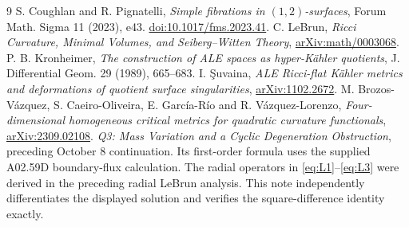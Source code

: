 \documentclass[11pt]{article}
\begin{document}
\begin{thebibliography}{9}
 S. Coughlan and R. Pignatelli,
\emph{Simple fibrations in $(1,2)$-surfaces},
Forum Math. Sigma 11 (2023), e43.
\href{https://doi.org/10.1017/fms.2023.41}{doi:10.1017/fms.2023.41}.
 C. LeBrun,
\emph{Ricci Curvature, Minimal Volumes, and Seiberg--Witten Theory},
\href{https://arxiv.org/abs/math/0003068}{arXiv:math/0003068}.
 P. B. Kronheimer,
\emph{The construction of ALE spaces as hyper-K\"ahler quotients},
J. Differential Geom. 29 (1989), 665--683.
 I. \c{S}uvaina,
\emph{ALE Ricci-flat K\"ahler metrics and deformations of quotient
surface singularities},
\href{https://arxiv.org/abs/1102.2672}{arXiv:1102.2672}.
 M. Brozos-V\'azquez, S. Caeiro-Oliveira,
E. Garc\'ia-R\'io and R. V\'azquez-Lorenzo,
\emph{Four-dimensional homogeneous critical metrics for quadratic
curvature functionals},
\href{https://arxiv.org/abs/2309.02108}{arXiv:2309.02108}.
 \emph{Q3: Mass Variation and a Cyclic Degeneration
Obstruction}, preceding October 8 continuation. Its first-order formula
uses the supplied A02.59D boundary-flux calculation. The radial operators
in \eqref{eq:L1}--\eqref{eq:L3} were derived in the preceding radial
LeBrun analysis. This note independently differentiates the displayed
solution and verifies the square-difference identity exactly.
\end{thebibliography}
\end{document}
